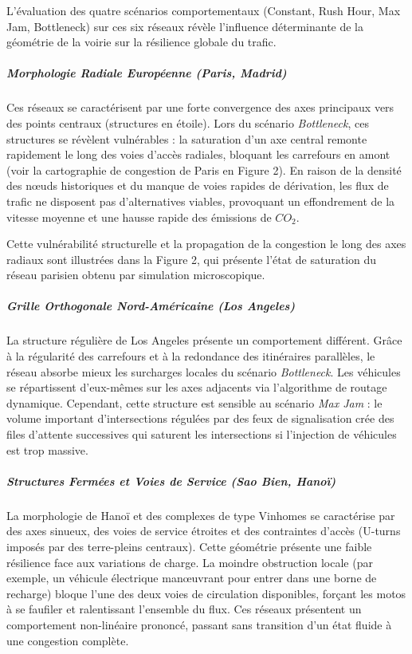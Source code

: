 \documentclass[10pt, a4paper]{article}
\begin{document}
L'évaluation des quatre scénarios comportementaux (Constant, Rush Hour,
Max Jam, Bottleneck) sur ces six réseaux révèle l'influence déterminante
de la géométrie de la voirie sur la résilience globale du trafic.

\subparagraph{Morphologie Radiale Européenne (Paris,
Madrid)}\label{morphologie-radiale-europuxe9enne-paris-madrid}

Ces réseaux se caractérisent par une forte convergence des axes
principaux vers des points centraux (structures en étoile). Lors du
scénario \emph{Bottleneck}, ces structures se révèlent vulnérables : la
saturation d'un axe central remonte rapidement le long des voies d'accès
radiales, bloquant les carrefours en amont (voir la cartographie de
congestion de Paris en Figure 2). En raison de la densité des nœuds
historiques et du manque de voies rapides de dérivation, les flux de
trafic ne disposent pas d'alternatives viables, provoquant un
effondrement de la vitesse moyenne et une hausse rapide des émissions de
\(CO_2\).

Cette vulnérabilité structurelle et la propagation de la congestion le
long des axes radiaux sont illustrées dans la Figure 2, qui présente
l'état de saturation du réseau parisien obtenu par simulation
microscopique.

\subparagraph{Grille Orthogonale Nord-Américaine (Los
Angeles)}\label{grille-orthogonale-nord-amuxe9ricaine-los-angeles}

La structure régulière de Los Angeles présente un comportement
différent. Grâce à la régularité des carrefours et à la redondance des
itinéraires parallèles, le réseau absorbe mieux les surcharges locales
du scénario \emph{Bottleneck}. Les véhicules se répartissent d'eux-mêmes
sur les axes adjacents via l'algorithme de routage dynamique. Cependant,
cette structure est sensible au scénario \emph{Max Jam} : le volume
important d'intersections régulées par des feux de signalisation crée
des files d'attente successives qui saturent les intersections si
l'injection de véhicules est trop massive.

\subparagraph{Structures Fermées et Voies de Service (Sao Bien,
Hanoï)}\label{structures-fermuxe9es-et-voies-de-service-sao-bien-hanouxef}

La morphologie de Hanoï et des complexes de type Vinhomes se caractérise
par des axes sinueux, des voies de service étroites et des contraintes
d'accès (U-turns imposés par des terre-pleins centraux). Cette géométrie
présente une faible résilience face aux variations de charge. La moindre
obstruction locale (par exemple, un véhicule électrique manœuvrant pour
entrer dans une borne de recharge) bloque l'une des deux voies de
circulation disponibles, forçant les motos à se faufiler et ralentissant
l'ensemble du flux. Ces réseaux présentent un comportement non-linéaire
prononcé, passant sans transition d'un état fluide à une congestion
complète.
\end{document}

